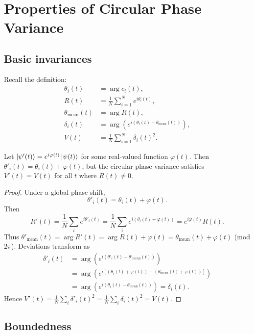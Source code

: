 \documentclass[11pt]{article}
\begin{document}
\section{Properties of Circular Phase Variance}

\subsection{Basic invariances}

Recall the definition:
\begin{align}
\theta_i(t) &= \arg c_i(t),\\
R(t) &= \frac{1}{N}\sum_{i=1}^N e^{i\theta_i(t)},\\
\theta_{\mathrm{mean}}(t) &= \arg R(t),\\
\delta_i(t) &= \arg\left(e^{i(\theta_i(t)-\theta_{\mathrm{mean}}(t))}\right),\\
V(t) &= \frac{1}{N}\sum_{i=1}^N \delta_i(t)^2.
\end{align}

\begin{lemma}
Let $\ket{\psi'(t)} = e^{i\varphi(t)}\ket{\psi(t)}$ for some real-valued function $\varphi(t)$. Then $\theta'_i(t) = \theta_i(t)+\varphi(t)$, but the circular phase variance satisfies $V' (t) = V(t)$ for all $t$ where $R(t)\neq 0$.
\end{lemma}

\begin{proof}
Under a global phase shift,
\[
\theta'_i(t) = \theta_i(t) + \varphi(t).
\]
Then
\[
R'(t) = \frac{1}{N}\sum_i e^{i\theta'_i(t)} = \frac{1}{N}\sum_i e^{i(\theta_i(t)+\varphi(t))}
= e^{i\varphi(t)}R(t).
\]
Thus $\theta'_{\mathrm{mean}}(t) = \arg R'(t) = \arg R(t) + \varphi(t) = \theta_{\mathrm{mean}}(t)+\varphi(t)$ (mod $2\pi$). Deviations transform as
\begin{align*}
\delta'_i(t) 
&= \arg\left(e^{i(\theta'_i(t)-\theta'_{\mathrm{mean}}(t))}\right)\\
&= \arg\left(e^{i[(\theta_i(t)+\varphi(t)) - (\theta_{\mathrm{mean}}(t)+\varphi(t))]}\right)\\
&= \arg\left(e^{i(\theta_i(t)-\theta_{\mathrm{mean}}(t))}\right) = \delta_i(t).
\end{align*}
Hence $V'(t) = \frac{1}{N}\sum_i \delta'_i(t)^2 = \frac{1}{N}\sum_i \delta_i(t)^2 = V(t)$.
\end{proof}

\subsection{Boundedness}
\end{document}
